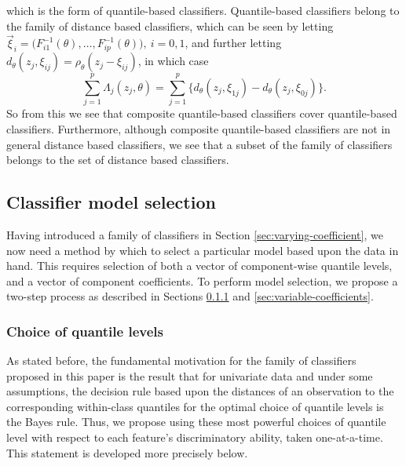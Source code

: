 which is the form of quantile-based classifiers.  Quantile-based classifiers
belong to the family of distance based classifiers, which can be seen by letting
$\vec{\xi}_i = \Big(F_{i1}^{-1}(\theta), \dots, F_{ip}^{-1}(\theta) \Big),~ i =
0, 1$, and further letting
$d_\theta(z_j, \xi_{ij}) = \rho_{\theta}(z_j - \xi_{ij})$, in which case
\begin{equation}
  \label{eq:quantile-is-distance-subset}
  \sum_{j=1}^p \Lambda_j (z_j, \theta) = \sum_{j=1}^p \Big\{ d_{\theta}(z_j,
  \xi_{1j}) - d_{\theta}(z_j, \xi_{0j}) \Big\}.
\end{equation}
So from this we see that composite quantile-based classifiers cover
quantile-based classifiers.  Furthermore, although composite quantile-based
classifiers are not in general distance based classifiers, we see that a subset
of the family of classifiers belongs to the set of distance based classifiers.




\subsection{Classifier model selection}
\label{sec:model-selection}

Having introduced a family of classifiers in Section
\ref{sec:varying-coefficient}, we now need a method by which to select a
particular model based upon the data in hand.  This requires selection of both a
vector of component-wise quantile levels, and a vector of component
coefficients.  To perform model selection, we propose a two-step process as
described in Sections \ref{sec:choice-of-quantile-lev} and
\ref{sec:variable-coefficients}.




\subsubsection{Choice of quantile levels}
\label{sec:choice-of-quantile-lev}

As stated before, the fundamental motivation for the family of classifiers
proposed in this paper is the result that for univariate data and under some
assumptions, the decision rule based upon the distances of an observation to the
corresponding within-class quantiles for the optimal choice of quantile levels
is the Bayes rule.  Thus, we propose using these most powerful choices of
quantile level with respect to each feature's discriminatory ability, taken
one-at-a-time.  This statement is developed more precisely below.

